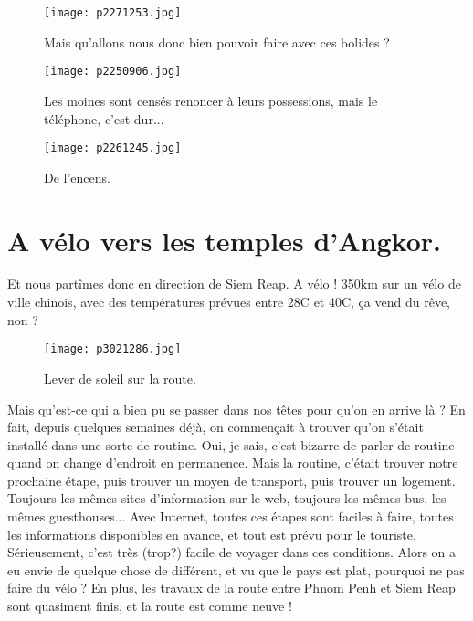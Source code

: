 \documentclass{book}
\begin{document}
\begin{figure}[h]
\centering
\texttt{[image: p2271253.jpg]}
\caption*{Mais qu'allons nous donc bien pouvoir faire avec ces bolides ?}
\end{figure}


\begin{figure}[h]
\centering
\texttt{[image: p2250906.jpg]}
\caption*{Les moines sont censés renoncer à leurs possessions, mais le téléphone, c'est dur...}
\end{figure}


\begin{figure}[h]
\centering
\texttt{[image: p2261245.jpg]}
\caption*{De l’encens.}
\end{figure}



\chapter{A vélo vers les temples d'Angkor.}
Et nous partîmes donc en direction de Siem Reap. A vélo ! 350km sur un vélo de ville chinois, avec des températures prévues entre 28\textdegree C et 40\textdegree C, ça vend du rêve, non ?


\begin{wrapfigure}{l}{0.65\textwidth}
\centering
\texttt{[image: p3021286.jpg]}
\caption*{Lever de soleil sur la route.}
\end{wrapfigure}

Mais qu'est-ce qui a bien pu se passer dans nos têtes pour qu'on en arrive là ? En fait, depuis quelques semaines déjà, on commençait à trouver qu'on s'était installé dans une sorte de routine. Oui, je sais, c'est bizarre de parler de routine quand on change d'endroit en permanence. Mais la routine, c'était trouver notre prochaine étape, puis trouver un moyen de transport, puis trouver un logement. Toujours les mêmes sites d'information sur le web, toujours les mêmes bus, les mêmes guesthouses... Avec Internet, toutes ces étapes sont faciles à faire, toutes les informations disponibles en avance, et tout est prévu pour le touriste. Sérieusement, c'est très (trop?) facile de voyager dans ces conditions. Alors on a eu envie de quelque chose de différent, et vu que le pays est plat, pourquoi ne pas faire du vélo ? En plus, les travaux de la route entre Phnom Penh et Siem Reap sont quasiment finis, et la route est comme neuve !
\end{document}
